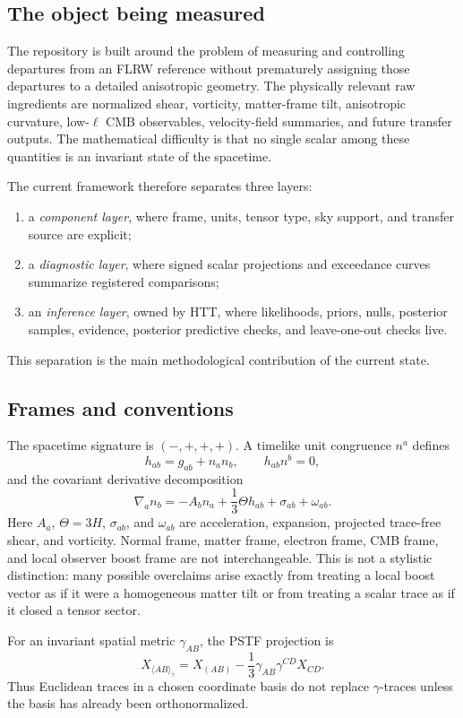 \documentclass[11pt]{article}
\newcommand{\code}[1]{\texttt{\detokenize{#1}}}
\begin{document}
\subsection{The object being measured}
The repository is built around the problem of measuring and controlling departures from an FLRW reference without prematurely assigning those departures to a detailed anisotropic geometry.  The physically relevant raw ingredients are normalized shear, vorticity, matter-frame tilt, anisotropic curvature, low-\(\ell\) CMB observables, velocity-field summaries, and future transfer outputs.  The mathematical difficulty is that no single scalar among these quantities is an invariant state of the spacetime.

The current framework therefore separates three layers:
\begin{enumerate}
  \item a \emph{component layer}, where frame, units, tensor type, sky support, and transfer source are explicit;
  \item a \emph{diagnostic layer}, where signed scalar projections and exceedance curves summarize registered comparisons;
  \item an \emph{inference layer}, owned by HTT, where likelihoods, priors, nulls, posterior samples, evidence, posterior predictive checks, and leave-one-out checks live.
\end{enumerate}
This separation is the main methodological contribution of the current \code{htt_base} state.

\subsection{Frames and conventions}
The spacetime signature is \((-,+,+,+)\).  A timelike unit congruence \(n^a\) defines
\[
  h_{ab}=g_{ab}+n_an_b,\qquad h_{ab}n^b=0,
\]
and the covariant derivative decomposition
\[
  \nabla_a n_b=-A_b n_a+\frac13\Theta h_{ab}+\sigma_{ab}+\omega_{ab}.
\]
Here \(A_a\), \(\Theta=3H\), \(\sigma_{ab}\), and \(\omega_{ab}\) are acceleration, expansion, projected trace-free shear, and vorticity.  Normal frame, matter frame, electron frame, CMB frame, and local observer boost frame are not interchangeable.  This is not a stylistic distinction: many possible overclaims arise exactly from treating a local boost vector as if it were a homogeneous matter tilt or from treating a scalar trace as if it closed a tensor sector.

For an invariant spatial metric \(\gamma_{AB}\), the PSTF projection is
\[
  X_{\langle AB\rangle_\gamma}
  =
  X_{(AB)}-\frac13\gamma_{AB}\gamma^{CD}X_{CD}.
\]
Thus Euclidean traces in a chosen coordinate basis do not replace \(\gamma\)-traces unless the basis has already been orthonormalized.
\end{document}

